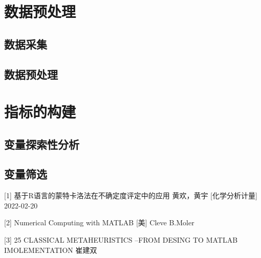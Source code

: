 \documentclass[a4paper,12pt]{article}
\begin{document}
\section{数据预处理}
\subsection{数据采集}

\subsection{数据预处理}


\section{指标的构建}
\subsection{变量探索性分析}

\subsection{变量筛选}






[1] 基于R语言的蒙特卡洛法在不确定度评定中的应用	黄欢，黄宇 [化学分析计量] 2022-02-20

[2] Numerical Computing with MATLAB [美] Cleve B.Moler

[3] 25 CLASSICAL METAHEURISTICS --FROM DESING TO MATLAB IMOLEMENTATION 崔建双


\end{document}
